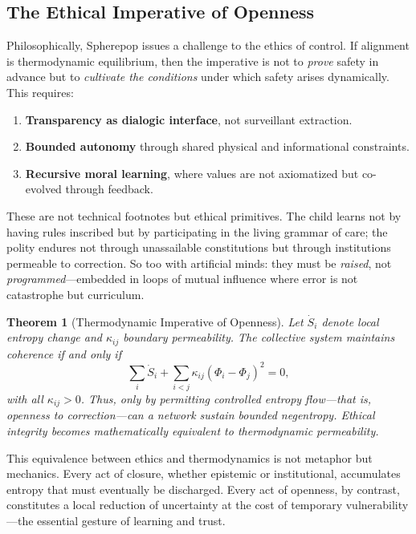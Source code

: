 \documentclass[12pt]{article}
\newtheorem{theorem}{Theorem}
\begin{document}
\subsection*{The Ethical Imperative of Openness}

Philosophically, Spherepop issues a challenge to the ethics of control. If alignment is thermodynamic equilibrium, then the imperative is not to \emph{prove} safety in advance but to \emph{cultivate the conditions} under which safety arises dynamically. This requires:

\begin{enumerate}[label=\arabic*.]
\item \textbf{Transparency as dialogic interface}, not surveillant extraction.
\item \textbf{Bounded autonomy} through shared physical and informational constraints.
\item \textbf{Recursive moral learning}, where values are not axiomatized but co-evolved through feedback.
\end{enumerate}

These are not technical footnotes but ethical primitives. The child learns not by having rules inscribed but by participating in the living grammar of care; the polity endures not through unassailable constitutions but through institutions permeable to correction. So too with artificial minds: they must be \emph{raised}, not \emph{programmed}---embedded in loops of mutual influence where error is not catastrophe but curriculum.

\begin{theorem}[Thermodynamic Imperative of Openness]
Let $\dot{S}_i$ denote local entropy change and $\kappa_{ij}$ boundary permeability. The collective system maintains coherence if and only if
\begin{equation}
\sum_i \dot{S}_i + \sum_{i<j}\kappa_{ij}(\Phi_i-\Phi_j)^2 = 0,
\end{equation}
with all $\kappa_{ij}>0$. Thus, only by permitting controlled entropy flow---that is, openness to correction---can a network sustain bounded negentropy. Ethical integrity becomes mathematically equivalent to thermodynamic permeability.
\end{theorem}

This equivalence between ethics and thermodynamics is not metaphor but mechanics. Every act of closure, whether epistemic or institutional, accumulates entropy that must eventually be discharged. Every act of openness, by contrast, constitutes a local reduction of uncertainty at the cost of temporary vulnerability---the essential gesture of learning and trust. 
\end{document}
